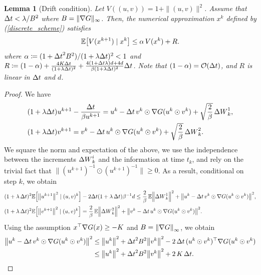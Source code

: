\documentclass[11pt, twoside]{report}
\newtheorem{lemma}[theorem]{Lemma}
\begin{document}
\begin{lemma}[Drift condition]\label{lem:2ndmoments_discrete}
Let $V((u,v))=1+\|(u,v)\|^2$.
Assume that ${\Delta t}  < \lambda/B^2$ where $B=\|\nabla G\|_\infty$. Then, the numerical approximation $x^k$ defined by (\ref{discrete_scheme}) satisfies
    $$
   \EE \bp{ V(x^{k+1})  \mid x^k}\leq \alpha\,  V(x^k)  +R .
    $$
    where $\alpha \coloneq (1+{\Delta t}^2 B^2)/ (1+\lambda {\Delta t})^2  <1$ and
    $R\coloneq (1-\alpha) +  \frac{4K {\Delta t}}{(1+\lambda {\Delta t})^2  } + \frac{4(1+{\Delta t} \lambda)d + 4d}{\beta (1+\lambda {\Delta t})^2  }{\Delta t}$. Note that $(1-\alpha) = \mathcal{O}({\Delta t})$, and $R$ is linear in ${\Delta t}$ and $d$.
\end{lemma}
\begin{proof} We have
    \begin{align}
        &(1+ \lambda {\Delta t}) u^{k+1} - \frac{{\Delta t}}{\beta u^{k+1}} = u^k - {\Delta t} \,v^k \odot \nabla G(u^k\odot v^k) + \sqrt{\frac{2}{\beta}} \,{\Delta W}^1_k,\\
         &(1+ \lambda {\Delta t}) v^{k+1} = v^k - {\Delta t}\, u^k \odot \nabla G(u^k \odot v^k) + \sqrt{\frac{2}{\beta}} \,{\Delta W}^2_k.
    \end{align}
    We square the norm and expectation of the above, we use the independence between the increments ${\Delta W}^i_k$ and the information at time $t_k$, and rely on the trivial fact that $\|(u^{k+1})^{-1} \odot (u^{k+1})^{-1}\| \geq 0$. 
    As a result, conditional on step $k$, we obtain 
    \begin{align*}
        &(1+ \lambda \,\deltat)^2 \EE \bp{\norm{u^{k+1}}^2\mid (u,v)^k} - 2\deltat (1+\lambda\, \deltat)\beta^{-1} d  \leq 
        {\frac{2}{\beta}}\, \EE \norm{\deltaw^1_k}^2 
          + \norm{u^k - \deltat \,v^k \odot \nabla G(u^k \odot v^k) }^2, \\
         &(1+ \lambda \,\deltat)^2 \EE\bp{\norm{v^{k+1}}^2\mid (u,v)^k}  = \frac{2}{\beta} \,\EE\norm{ \deltaw^2_k}^2  + \norm{v^k - \deltat\, u^k \odot \nabla G(u^k\odot v^k)}^2.
    \end{align*}
Using the assumption $x^\top \nabla G(x) \geq -K$ and $B=\left\lVert\nabla G\right\rVert_\infty$, we obtain 
    \begin{align*}
        \norm{u^k-\deltat \,v^k \odot \nabla G(u^k\odot  v^k)}^2 &\leq \norm{u^k}^2  + \deltat^2 \cinfty^2 \norm{v^k}^2 - 2 \,\Delta t\,(u^k \odot v^k)^\top \nabla G(u^k \odot v^k)\\
        &\leq \norm{u^k}^2  + \deltat^2 \cinfty^2 \norm{v^k}^2 +2\,\ccc\,\deltat.
    \end{align*}

\end{proof}
\end{document}
